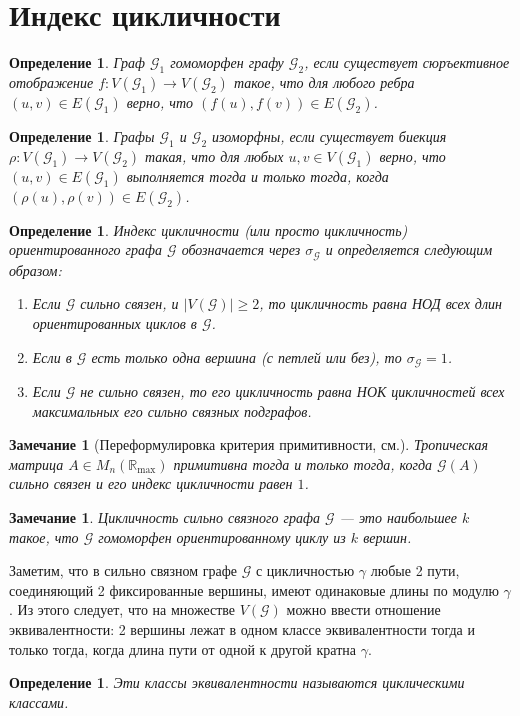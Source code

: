 \documentclass[12pt]{article}
\newtheorem{definition}[theorem]{Определение}
\newtheorem{remark}[theorem]{Замечание}
\begin{document}
\section{Индекс цикличности}
\begin{definition}
Граф $\mathcal{G}_1$ гомоморфен графу $\mathcal{G}_2$, если существует сюръективное отображение $f : V(\mathcal{G}_1) \rightarrow V(\mathcal{\mathcal{G}}_2)$ такое, что для любого ребра $(u, v) \in E(\mathcal{G}_1)$ верно, что $(f(u), f(v)) \in E(\mathcal{G}_2)$.
\end{definition}
\begin{definition}
Графы $\mathcal{G}_1$ и $\mathcal{G}_2$ изоморфны, если существует биекция $\rho : V(\mathcal{G}_1) \rightarrow V(\mathcal{G}_2)$ такая, что для любых $u, v \in V(\mathcal{G}_1)$ верно, что $(u, v) \in E(\mathcal{G}_1)$ выполняется тогда и только тогда, когда $(\rho(u), \rho(v)) \in E(\mathcal{G}_2)$.
\end{definition}

\begin{definition}
Индекс цикличности (или просто цикличность) ориентированного графа $\mathcal{G}$ обозначается через $\sigma_\mathcal{G}$ и определяется следующим образом:
\begin{enumerate}
    \item Если $\mathcal{G}$ сильно связен, и $|V(\mathcal{G})| \ge 2$, то цикличность равна НОД всех длин ориентированных циклов в $\mathcal{G}$.
    \item Если в $\mathcal{G}$ есть только одна вершина (с петлей или без), то $\sigma_\mathcal{G} = 1$.
    \item Если $\mathcal{G}$ не сильно связен, то его цикличность равна НОК цикличностей всех максимальных его сильно связных подграфов.
\end{enumerate}
\end{definition}
\begin{remark}[Переформулировка критерия примитивности, см.\cite{Brualdi}] Тропическая матрица $A \in M_n(\mathbb{R}_{\max})$ примитивна тогда и только тогда, когда $\mathcal{G}(A)$ сильно связен и его индекс цикличности равен $1$.
\end{remark}
\begin{remark}
Цикличность сильно связного графа $\mathcal{G}$ --- это наибольшее $k$ такое, что $\mathcal{G}$ гомоморфен ориентированному циклу из $k$ вершин.
\end{remark}

Заметим, что в сильно связном графе $\mathcal{G}$ с цикличностью $\gamma$ любые 2 пути, соединяющий 2 фиксированные вершины, имеют одинаковые длины по модулю $\gamma$. Из этого следует, что на множестве $V(\mathcal{G})$ можно ввести отношение эквивалентности: 2 вершины лежат в одном классе эквивалентности тогда и только тогда, когда длина пути от одной к другой кратна $\gamma$.
\begin{definition}
Эти классы эквивалентности называются циклическими классами.
\end{definition}
\end{document}
